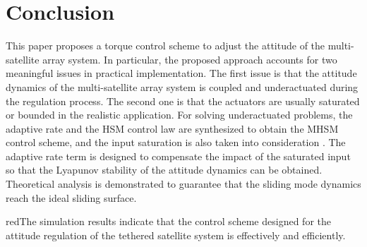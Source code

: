 \section{Conclusion}\label{sec:Conclusion}
This paper proposes a torque control scheme to adjust the attitude of the multi-satellite array system. In particular, the proposed approach accounts for two meaningful issues in practical implementation. The first issue is that the attitude dynamics of the multi-satellite array system is coupled and underactuated during the regulation process. The second one is that the actuators are usually saturated or bounded in the realistic application. For solving underactuated problems, the adaptive rate and the HSM control law are synthesized to obtain the MHSM control scheme, and the input saturation is also taken into consideration . The adaptive rate term is designed to compensate the impact of the saturated input so that the Lyapunov stability of the attitude dynamics can be obtained. Theoretical analysis is demonstrated to guarantee that the sliding mode dynamics reach the ideal sliding surface. \begin{color}{red}The simulation results indicate that the control scheme designed for the attitude regulation of the tethered satellite system is effectively and efficiently.\end{color}
%



